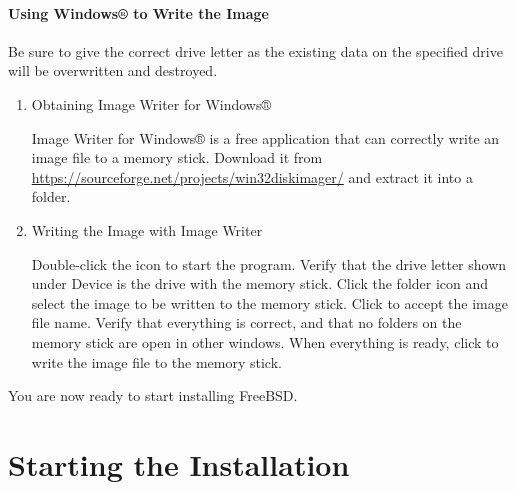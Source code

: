 \paragraph{Using Windows® to Write the Image}
\begin{warning}
Be sure to give the correct drive letter as the existing data on the specified drive will be overwritten and destroyed.
\end{warning}
\begin{enumerate}
\item
   Obtaining Image Writer for Windows®

   Image Writer for Windows® is a free application that can correctly write an image file to a memory stick.
   Download it from \url{https://sourceforge.net/projects/win32diskimager/} and extract it into a folder.
\item
   Writing the Image with Image Writer

   Double-click the  icon to start the program. 
   Verify that the drive letter shown under Device is the drive with the memory stick.
   Click the folder icon and select the image to be written to the memory stick.
   Click \key{[ Save ]} to accept the image file name.
   Verify that everything is correct, and that no folders on the memory stick are open in other windows.
   When everything is ready, click \key{[ Write ]} to write the image file to the memory stick.
\end{enumerate}
You are now ready to start installing FreeBSD.





\section{Starting the Installation}
